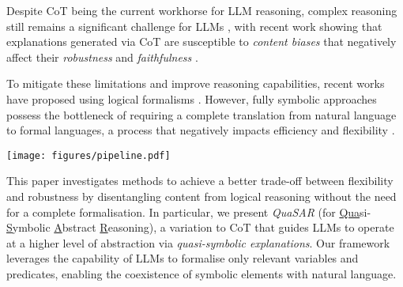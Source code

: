 \documentclass[11pt]{article}
\newcommand{\QuaSAR}{\emph{QuaSAR}\xspace}
\begin{document}
Despite CoT being the current workhorse for LLM reasoning, complex reasoning still remains a significant challenge for LLMs \cite{10.1162/tacl_a_00594,luo2024improve}, with recent work showing that explanations generated via CoT are susceptible to \emph{content biases} that negatively affect their \emph{robustness} and \emph{faithfulness} \cite{lyu2023faithful,turpin2024language, yee2024dissociation}. 


To mitigate these limitations and improve reasoning capabilities, recent works have proposed using logical formalisms \cite{lyu2023faithful,jiang2024leanreasoner,arakelyan2024flarefaithfullogicaidedreasoning}. However, fully symbolic approaches possess the bottleneck of requiring a complete translation from natural language to formal languages, a process that negatively impacts efficiency and flexibility \cite{dinh2023largelanguagemodelscode,quan2024verificationrefinementnaturallanguage,quan-etal-2024-enhancing,dalal-etal-2024-inference}.

\begin{figure*}[t]
\centering
    \texttt{[image: figures/pipeline.pdf]}
    \caption{\QuaSAR elicits quasi-symbolic abstractions in LLMs via the following steps: \textit{(i)} \textit{Abstraction}, where the problem is analysed and abstracted in terms of relevant symbolic predicates, variables, and constants; \textit{(ii)} \textit{Formalisation}, where the original problem is reformulated using a mixture of symbolic expressions and natural language; \textit{(iii)} \textit{Explanation}, where the necessary steps to compute the solution are formulated via quasi-symbolic reasoning chains; and \textit{(iv)} \textit{Answering}, where a final solution is generated. We use \QuaSAR as an in-context learning strategy and for constructing reasoning demonstrations for smaller LLMs. }
    \label{fig:pipeline}
\end{figure*}

This paper investigates methods to achieve a better trade-off between flexibility and robustness by disentangling content from logical reasoning without the need for a complete formalisation. In particular, we present \emph{QuaSAR} (for \underline{Qua}si-\underline{S}ymbolic \underline{A}bstract \underline{R}easoning), a variation to CoT that guides LLMs to operate at a higher level of abstraction via \emph{quasi-symbolic explanations}. Our framework leverages the capability of LLMs to formalise only relevant variables and predicates, enabling the coexistence of symbolic elements with natural language.
\end{document}
